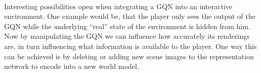 \documentclass[a4paper, twoside, 10pt]{report}
\begin{document}
\paragraph{}
Interesting possibilities open when integrating a GQN into an interactive environment. One example would be, that the player only sees the output of the GQN while the underlying “real” state of the environment is hidden from him. Now by manipulating the GQN we can influence how accurately its renderings are, in turn influencing what information is available to the player. One way this can be achieved is by deleting or adding new scene images to the representation network to encode into a new world model.

%
%
%
%
%
\end{document}
